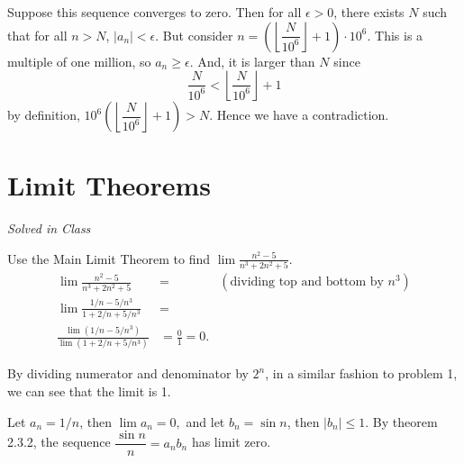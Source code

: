 \documentclass[12pt]{book}
\newenvironment{exercise}[2][Exercise]{\begin{trivlist}
\item[\hskip \labelsep {\bfseries #1}\hskip \labelsep {\bfseries #2.}]}{\end{trivlist}}
\begin{document}
\begin{exercise}{2.2.15} 
Suppose this sequence converges to zero. Then for all $\epsilon > 0$, there exists $N$ such that for all $n > N$, $|a_n| < \epsilon.$ But consider $n = \displaystyle \left(\left \lfloor \dfrac{N}{10^6} \right \rfloor + 1\right ) \cdot 10^6.$ This is a multiple of one million, so $a_n \geq \epsilon.$ And, it is larger than $N$ since $$\dfrac{N}{10^6} < \left \lfloor \dfrac{N}{10^6} \right \rfloor+1$$ by definition, $10^6 \left(\left \lfloor \dfrac{N}{10^6} \right \rfloor + 1\right) > N.$ Hence we have a contradiction. 
\end{exercise}



\section{Limit Theorems}

\begin{exercise}{2.3.1}
\emph{Solved in Class}
\end{exercise}


\begin{exercise}{2.3.2}
Use the Main Limit Theorem to find $\lim \frac{n^2 - 5}{n^3 + 2n^2 + 5}$. \\
	\begin{align*}
		\lim \frac{n^2 - 5}{n^3 + 2n^2 + 5} &=  &(\text{dividing top and bottom by $n^3$}) \\
		\lim \frac{1/n - 5/n^3}{1+2/n + 5/n^3} &= \\
		\frac{\lim (1/n - 5/n^3)}{\lim (1+2/n + 5/n^3)} &= \frac{0}{1} = 0.
	\end{align*}
\end{exercise}

\begin{exercise}{2.3.3}
By dividing numerator and denominator by $2^n$, in a similar fashion to problem 1, we can see that the limit is 1. 



\end{exercise}

\begin{exercise}{2.3.4}
Let $a_n = 1/n$, then $\lim a_n = 0,$ and let $b_n = \sin n$, then $|b_n| \leq 1$. By theorem 2.3.2, the sequence $\dfrac{\sin n}{n} = a_n b_n$ has limit zero. 
\end{exercise}
\end{document}
